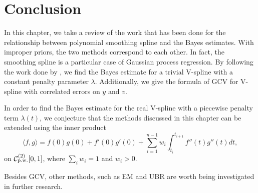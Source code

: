 \section{Conclusion}

In this chapter, we take a review of the work that has been done for the relationship between polynomial smoothing spline and the Bayes estimates. With improper priors, the two methods correspond to each other. In fact, the smoothing spline is a particular case of Gaussian process regression. By following the work done by \cite{gu2013smoothing}, we find the Bayes estimate for a trivial V-spline with a constant penalty parameter $\lambda$. Additionally, we give the formula of GCV for V-spline with correlated errors on $y$ and $v$. 


In order to find the Bayes estimate for the real V-spline with a piecewise penalty term $\lambda(t)$, we conjecture that the methods discussed in this chapter can be extended using the inner product 
\begin{equation*}
\langle f,g \rangle=f(0) g(0)+f'(0) g'(0)+\sum_{i=1}^{n-1}w_i\int_{t_i}^{t_{i+1}}f''(t)g''(t)dt,
\end{equation*}
on $\mathcal{C}^{(2)}_{\mbox{\scriptsize p.w.}}[0,1]$, where $\sum_i w_i=1$ and $w_i>0$. 

Besides GCV, other methods, such as EM and UBR are worth being investigated in further research. 








